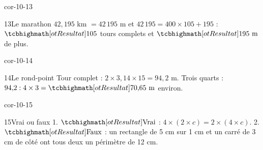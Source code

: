 \begin{blocLivre}{cor-10-13}\begin{corrige}{13}{Le marathon}
$42{,}195$ km $=42\,195$ m et $42\,195=400\times105+195$ : $\res{105}$ tours complets et $\res{195\ \mathrm{m}}$ de plus.
\end{corrige}\end{blocLivre}
\begin{blocLivre}{cor-10-14}\begin{corrige}{14}{Le rond-point}
Tour complet : $2\times3{,}14\times15=94{,}2$ m. Trois quarts : $94{,}2:4\times3=\res{70{,}65\ \mathrm{m}}$ environ.
\label{fig-cor-10-14}
\end{corrige}\end{blocLivre}
\begin{blocLivre}{cor-10-15}\begin{corrige}{15}{Vrai ou faux}
1. $\res{\text{Vrai}}$ : $4\times(2\times c)=2\times(4\times c)$. 2. $\res{\text{Faux}}$ : un rectangle de 5 cm sur 1 cm et un carré de 3 cm de côté ont tous deux un périmètre de 12 cm.
\end{corrige}\end{blocLivre}
